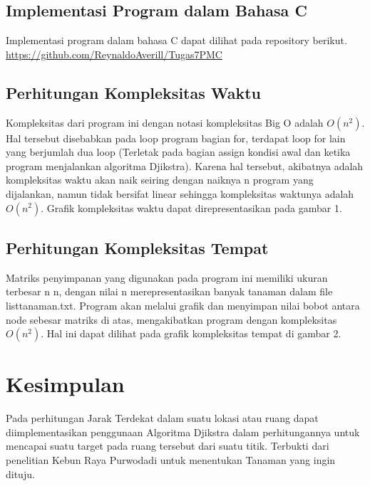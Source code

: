 \documentclass[10pt, conference]{IEEEtran}
\begin{document}
\subsection{Implementasi Program dalam Bahasa C}
Implementasi program dalam bahasa C dapat dilihat pada repository berikut. \textcolor{blue}{\url{https://github.com/ReynaldoAverill/Tugas7PMC}}

\subsection{Perhitungan Kompleksitas Waktu}
Kompleksitas dari program ini dengan notasi kompleksitas Big O adalah $O(n^2)$. Hal tersebut disebabkan pada loop program bagian for, terdapat loop for lain yang berjumlah dua loop (Terletak pada bagian assign kondisi awal dan ketika program menjalankan algoritma Djikstra). Karena hal tersebut, akibatnya adalah kompleksitas waktu akan naik seiring dengan naiknya n program yang dijalankan, namun tidak bersifat linear sehingga kompleksitas waktunya adalah $O(n^2)$. Grafik kompleksitas waktu dapat direpresentasikan pada gambar 1.

\subsection{Perhitungan Kompleksitas Tempat}
Matriks penyimpanan yang digunakan pada program ini memiliki ukuran terbesar n  n, dengan nilai n merepresentasikan banyak tanaman dalam file listtanaman.txt. Program akan melalui grafik dan menyimpan nilai bobot antara node sebesar matriks di atas, mengakibatkan program dengan kompleksitas $O(n^2)$. Hal ini dapat dilihat pada grafik kompleksitas tempat di gambar 2.

\section{Kesimpulan}
Pada perhitungan Jarak Terdekat dalam suatu lokasi atau ruang dapat diimplementasikan penggunaan Algoritma Djikstra dalam perhitungannya untuk mencapai suatu target pada ruang tersebut dari suatu titik. Terbukti dari penelitian Kebun Raya Purwodadi untuk menentukan Tanaman yang ingin dituju. 



\end{document}
